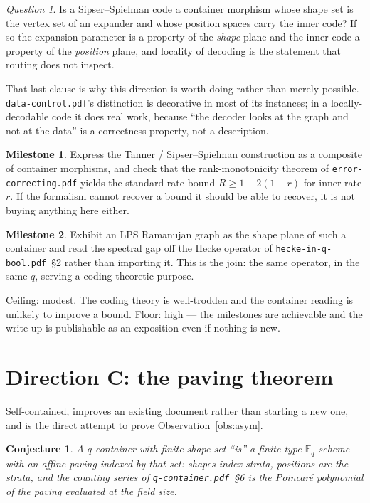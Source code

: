 \documentclass[11pt,a4paper]{article}
\newtheorem{conjecture}[theorem]{Conjecture}
\theoremstyle{definition}
\newtheorem{milestone}{Milestone}
\theoremstyle{remark}
\newtheorem{question}[theorem]{Question}
\newcommand{\HQB}{\texttt{hecke-\allowbreak{}in-\allowbreak{}q-\allowbreak{}bool.pdf}}
\newcommand{\FF}{\mathbb{F}}
\begin{document}
\begin{question}\label{q:expander}
Is a Sipser--Spielman code a container morphism whose shape set is the vertex
set of an expander and whose position spaces carry the inner code? If so the
expansion parameter is a property of the \emph{shape} plane and the inner code a
property of the \emph{position} plane, and locality of decoding is the
statement that routing does not inspect.
\end{question}

That last clause is why this direction is worth doing rather than merely
possible. \texttt{data-control.pdf}'s distinction is decorative in most of its
instances; in a locally-decodable code it does real work, because ``the decoder
looks at the graph and not at the data'' is a correctness property, not a
description.

\begin{milestone}\label{m:B1}
Express the Tanner / Sipser--Spielman construction as a composite of container
morphisms, and check that the rank-monotonicity theorem of
\texttt{error-correcting.pdf} yields the standard rate bound
$R \ge 1 - 2(1-r)$ for inner rate $r$. If the formalism cannot recover a bound
it should be able to recover, it is not buying anything here either.
\end{milestone}

\begin{milestone}\label{m:B2}
Exhibit an LPS Ramanujan graph as the shape plane of such a container and read
the spectral gap off the Hecke operator of \HQB{}~\S2
rather than importing it. This is the join: the same operator, in the same
$q$, serving a coding-theoretic purpose.
\end{milestone}

Ceiling: modest. The coding theory is well-trodden and the container reading is
unlikely to improve a bound. Floor: high --- the milestones are achievable and
the write-up is publishable as an exposition even if nothing is new.

\section{Direction C: the paving theorem}\label{sec:C}

Self-contained, improves an existing document rather than starting a new one,
and is the direct attempt to prove Observation~\ref{obs:asym}.

\begin{conjecture}\label{conj:pave}
A $q$-container with finite shape set ``is'' a finite-type $\FF_q$-scheme with
an affine paving indexed by that set: shapes index strata, positions are the
strata, and the counting series of \texttt{q-container.pdf}~\S6 is the
Poincar\'e polynomial of the paving evaluated at the field size.
\end{conjecture}
\end{document}
